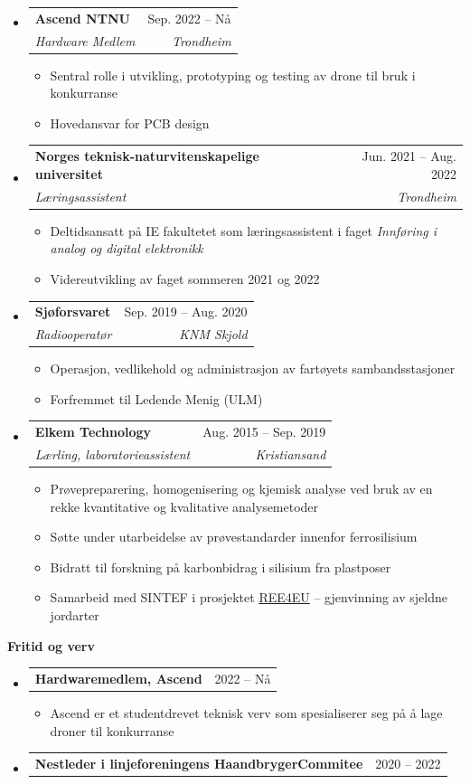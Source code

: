 \documentclass[letterpaper,12pt]{article}[leftmargin=*]
\makeatletter
\def \entryspacing {-0pt}
\renewcommand{\section}[2]{\vspace{5pt}
  \colorbox{secondary}{\color{white}\raggedbottom\normalsize\textbf{{#1}{\hspace{7pt}#2}}}
}
\newcommand{\resumeEntryStart}{\begin{itemize}[leftmargin=2.5mm]}
\newcommand{\resumeEntryEnd}{\end{itemize}\vspace{\entryspacing}}
\newcommand{\resumeItemListStart}{\begin{itemize}[leftmargin=4.5mm]}
\newcommand{\resumeItemListEnd}{\end{itemize}}
\newcommand{\resumeItem}[1]{
  \item\small{
    {#1 \vspace{-2pt}}
  }
}
\newcommand{\resumeEntryTSDL}[4]{
  \vspace{-1pt}\item[]
    \begin{tabularx}{0.97\textwidth}{X@{\hspace{60pt}}r}
      \textbf{\color{primary}#1} & {\firabook\color{accent}\small#2} \\
      \textit{\color{accent}\small#3} & \textit{\color{accent}\small#4} \\
    \end{tabularx}\vspace{-6pt}
}
\newcommand{\resumeEntryTD}[2]{
  \vspace{-1pt}\item[]
    \begin{tabularx}{0.97\textwidth}{X@{\hspace{60pt}}r}
      \textbf{\color{primary}#1} & {\firabook\color{accent}\small#2} \\
    \end{tabularx}\vspace{-6pt}
}
\makeatother
\begin{document}
  \resumeEntryStart
    \resumeEntryTSDL
      {Ascend NTNU}{Sep. 2022 -- Nå}
      {Hardware Medlem}{Trondheim}
    \resumeItemListStart
      \resumeItem {Sentral rolle i utvikling, prototyping og testing av drone til bruk i konkurranse}
      \resumeItem {Hovedansvar for PCB design}
    \resumeItemListEnd
  \resumeEntryEnd

  \resumeEntryStart
    \resumeEntryTSDL
      {Norges teknisk-naturvitenskapelige universitet}{Jun. 2021 -- Aug. 2022}
      {Læringsassistent}{Trondheim}
    \resumeItemListStart
      \resumeItem {Deltidsansatt på IE fakultetet som læringsassistent i faget \textit{Innføring i analog og digital elektronikk}}
      \resumeItem {Videreutvikling av faget sommeren 2021 og 2022}
    \resumeItemListEnd
  \resumeEntryEnd

  \resumeEntryStart
    \resumeEntryTSDL
      {Sjøforsvaret}{Sep. 2019 -- Aug. 2020}
      {Radiooperatør}{KNM Skjold}
    \resumeItemListStart
        \resumeItem {Operasjon, vedlikehold og administrasjon av fartøyets sambandsstasjoner}
        \resumeItem {Forfremmet til Ledende Menig (ULM)}
    \resumeItemListEnd
  \resumeEntryEnd
\newpage
  \resumeEntryStart
    \resumeEntryTSDL
      {Elkem Technology}{Aug. 2015 -- Sep. 2019}
      {Lærling, laboratorieassistent}{Kristiansand}
    \resumeItemListStart
      \resumeItem {Prøvepreparering, homogenisering og kjemisk analyse ved bruk av en rekke kvantitative og kvalitative analysemetoder}
      \resumeItem {Søtte under utarbeidelse av prøvestandarder innenfor ferrosilisium}
      \resumeItem {Bidratt til forskning på karbonbidrag i silisium fra plastposer}
      \resumeItem{Samarbeid med SINTEF i prosjektet \href{https://ree4eu.eu/}{REE4EU} -- gjenvinning av sjeldne jordarter}
    \resumeItemListEnd
  \resumeEntryEnd


\section{\faRocket}{Fritid og verv}

  \resumeEntryStart
    \resumeEntryTD
      {Hardwaremedlem, Ascend}{2022 -- Nå}
    \resumeItemListStart
      \resumeItem {Ascend er et studentdrevet teknisk verv som spesialiserer seg på å lage droner til konkurranse}
    \resumeItemListEnd
  \resumeEntryEnd

  \resumeEntryStart
    \resumeEntryTD
      {Nestleder i linjeforeningens HaandbrygerCommitee}{2020 -- 2022}
  \resumeEntryEnd
\end{document}
